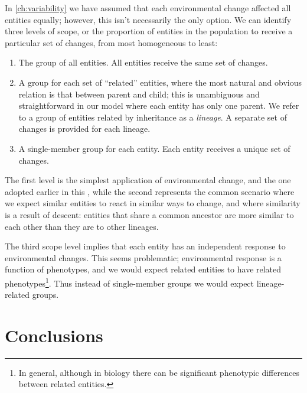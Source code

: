 In \cref{ch:variability} we have assumed that each environmental change affected all entities equally; however, this isn't necessarily the only option. We can identify three levels of scope, or the proportion of entities in the population to receive a particular set of changes, from most homogeneous to least:

\begin{enumerate}
	\item The group of all entities. All entities receive the same set of changes.
	\item A group for each set of ``related'' entities, where the most natural and obvious relation is that between parent and child; this is unambiguous and straightforward in our model where each entity has only one parent. We refer to a group of entities related by inheritance as a \emph{lineage}. A separate set of changes is provided for each lineage.
	\item A single-member group for each entity. Each entity receives a unique set of changes.
\end{enumerate}

The first level is the simplest application of environmental change, and the one adopted earlier in this , while the second represents the common scenario where we expect similar entities to react in similar ways to change, and where similarity is a result of descent: entities that share a common ancestor are more similar to each other than they are to other lineages. 

The third scope level implies that each entity has an independent response to environmental changes. This seems problematic; environmental response is a function of phenotypes, and we would expect related entities to have related phenotypes\footnote{In general, although in biology there can be significant phenotypic differences between related entities.}. Thus instead of single-member groups we would expect lineage-related groups.

\section{Conclusions}

